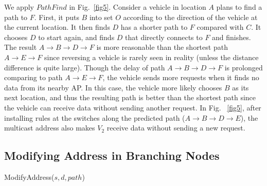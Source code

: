 \documentclass[journal]{IEEEtran}
\begin{document}
We apply $PathFind$ in Fig.~\ref{fig5}. Consider a vehicle in location $A$ plans to find a path to $F$. First, it puts $B$ into set $O$ according to the direction of the vehicle at the current location. It then finds $D$ has a shorter path to $F$ compared with $C$. It chooses $D$ to start again, and finds $D$ that directly connects to $F$ and finishes. The result $A \to B \to D \to F$ is more reasonable than the shortest path $A \to E \to F$ since reversing a vehicle is rarely seen in reality (unless the distance difference is quite large). Though the delay of path $A \to B \to D \to F$ is prolonged comparing to path $A \to E \to F$, the vehicle sends more requests when it finds no data from its nearby AP. In this case, the vehicle more likely chooses $B$ as its next location, and thus the resulting path is better than the shortest path since the vehicle can receive data without sending another request. In Fig. ~\ref{fig5}, after installing rules at the switches along the predicted path ($A \to B \to D \to E$), the multicast address also makes $V_{2}$ receive data without sending a new request.




\subsection{Modifying Address in Branching Nodes} \label{Modify address}

\begin{algorithm}[t]
\caption{ModifyAddress($s,d,path$)}
\label{Algorithm 3}
\begin{algorithmic}[1]

\end{algorithmic}
\vspace{-0.06in}
\end{algorithm}
\end{document}

